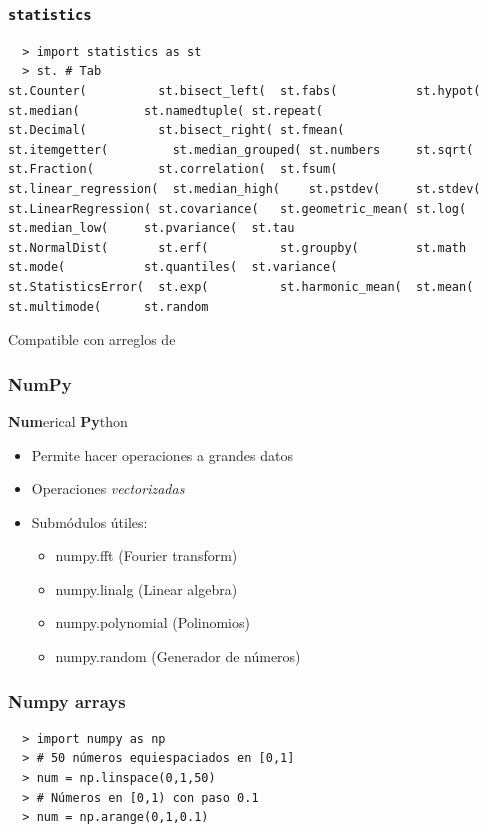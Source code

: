 \documentclass[14pt,aspectratio=169,xcolor=dvipsnames]{beamer}
\begin{document}
\begin{frame}[fragile]\frametitle{\texttt{statistics}}
    \begin{verbatim}
  > import statistics as st
  > st. # Tab
st.Counter(          st.bisect_left(  st.fabs(           st.hypot(              st.median(         st.namedtuple( st.repeat(
st.Decimal(          st.bisect_right( st.fmean(          st.itemgetter(         st.median_grouped( st.numbers     st.sqrt(
st.Fraction(         st.correlation(  st.fsum(           st.linear_regression(  st.median_high(    st.pstdev(     st.stdev(
st.LinearRegression( st.covariance(   st.geometric_mean( st.log(                st.median_low(     st.pvariance(  st.tau
st.NormalDist(       st.erf(          st.groupby(        st.math                st.mode(           st.quantiles(  st.variance(
st.StatisticsError(  st.exp(          st.harmonic_mean(  st.mean(               st.multimode(      st.random      
    \end{verbatim}
    Compatible con arreglos de  
\end{frame}
\begin{frame}\frametitle{NumPy}
    \textbf{Num}erical \textbf{Py}thon
    
    \begin{itemize}
        \item Permite hacer operaciones a grandes datos
        \item Operaciones \emph{vectorizadas}
        \item Submódulos útiles: 
            \begin{itemize}
                \item numpy.fft (Fourier transform)
                \item numpy.linalg (Linear algebra)
                \item numpy.polynomial (Polinomios)
                \item numpy.random (Generador de números)
            \end{itemize}
    \end{itemize}
\end{frame}
\begin{frame}[fragile]\frametitle{Numpy arrays}
    \begin{verbatim}
  > import numpy as np
  > # 50 números equiespaciados en [0,1]
  > num = np.linspace(0,1,50)
  > # Números en [0,1) con paso 0.1
  > num = np.arange(0,1,0.1)
    \end{verbatim}

\pause {}
\end{frame}
\end{document}
